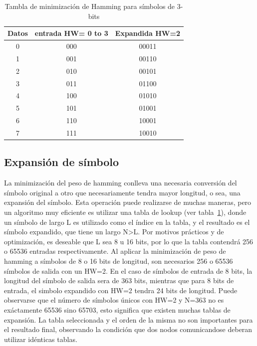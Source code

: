 \documentclass[12pt,twoside,openright]{moddalthesis}
\begin{document}
\begin{table}[t]
\begin{center}
\begin{tabular}{c c c}
Datos & entrada HW= 0 to 3 & Expandida HW=2\\
\hline\hline
0 & 000 & 00011\\
1 & 001 & 00110\\
2 & 010 & 00101\\
3 & 011 & 01100\\
4 & 100 & 01010\\
5 & 101 & 01001\\
6 & 110 & 10001\\
7 & 111 & 10010\\
\end{tabular}
\caption{Tambla de minimización de Hamming para símbolos de 3-bits}
\label{hwtable}
\end{center}
 \end{table}
 
\subsection{Expansión de símbolo}
La minimización del peso de hamming conlleva una necesaria conversión del símbolo original a otro que necesariamente tendra mayor longitud, o sea, una expansión del símbolo.
Esta operación puede realizarse de muchas maneras, pero un algoritmo muy eficiente es utilizar una tabla de lookup (ver tabla~\ref{hwtable}), donde un símbolo de largo L es utilizado como el índice en la tabla, y el resultado es el símbolo expandido, que tiene un largo N\textgreater L.
Por motivos prácticos y de optimización, es deseable que L sea 8 u 16 bits, por lo que la tabla contendrá 256 o 65536 entradas respectivamente.
Al aplicar la minimización de peso de hamming a símbolos de 8 o 16 bits de longitud, son necesarios 256 o 65536 símbolos de salida con un HW=2. En el caso de símbolos de entrada de 8 bits, la longitud del símbolo de salida sera de 363 bits, mientras que para 8 bits de entrada, el simbolo expandido con HW=2 tendra 24 bits de longitud.
Puede observarse que el número de símbolos únicos con HW=2 y N=363 no es exáctamente 65536 sino 65703, esto significa que existen muchas tablas de expansión.
La tabla seleccionada y el orden de la misma no son importantes para el resultado final, observando la condición que dos nodos comunicandose deberan utilizar idénticas tablas.
\end{document}
